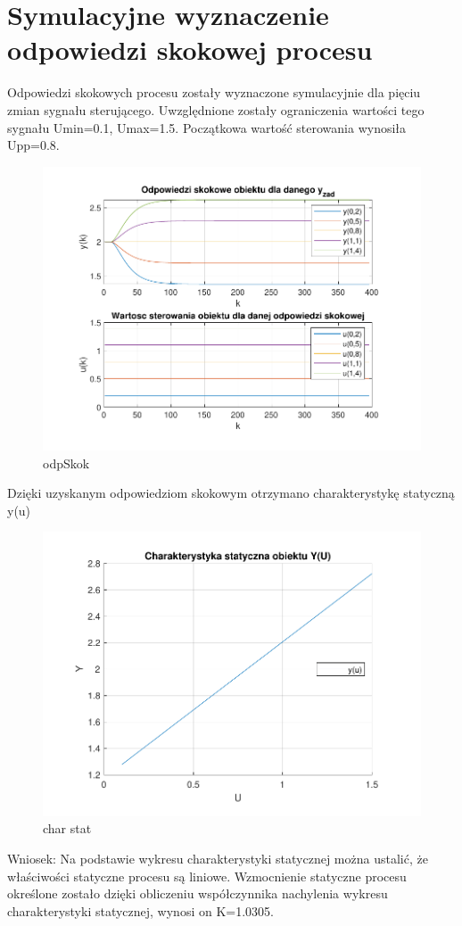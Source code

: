 \section{Symulacyjne wyznaczenie odpowiedzi skokowej procesu}

Odpowiedzi skokowych procesu zostały wyznaczone symulacyjnie dla pięciu zmian sygnału sterującego. 
Uwzględnione zostały ograniczenia wartości tego sygnału Umin=\num{0.1}, Umax=\num{1.5}. 
Początkowa wartość sterowania wynosiła Upp=\num{0.8}.

\begin{figure}[H]
    \centering
    \includegraphics[scale=0.8]{../projekt/zad2/odp_skok.pdf}
    \caption{ odpSkok }
\end{figure}

Dzięki uzyskanym odpowiedziom skokowym otrzymano charakterystykę statyczną y(u)
\begin{figure}[H]
    \centering
    \includegraphics[scale=0.8]{../projekt/zad2/char_stat.pdf}
    \caption{char stat}
\end{figure}

Wniosek: 
Na podstawie wykresu charakterystyki statycznej można ustalić, 
że właściwości statyczne procesu są liniowe. 
Wzmocnienie statyczne procesu określone zostało dzięki obliczeniu współczynnika nachylenia 
wykresu charakterystyki statycznej, wynosi on K=\num{1.0305}.
